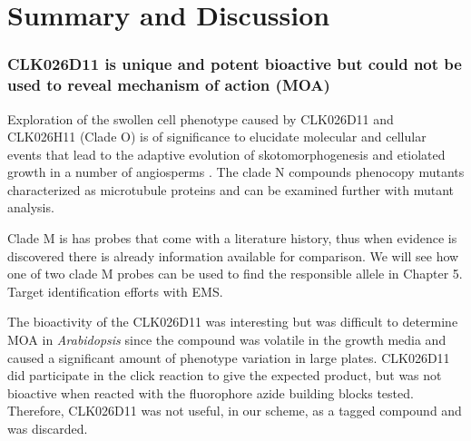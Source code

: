 \section{Summary and Discussion}

\subsubsection{CLK026D11 is unique and potent bioactive but could not be used to reveal mechanism of action (MOA)}

Exploration of the swollen cell phenotype caused by CLK026D11 and CLK026H11 (Clade O) is of significance to elucidate molecular and cellular events that lead to the adaptive evolution of skotomorphogenesis and etiolated growth in a number of angiosperms \cite{gendreau1997cellular, gendreau1998phytochrome}. The clade N compounds phenocopy mutants characterized as microtubule proteins \cite{nakamura2004low} and can be examined further with mutant analysis. 




Clade M is has probes that come with a literature history, thus when evidence is discovered there is already information available for comparison. We will see how one of two clade M probes can be used to find the responsible allele in Chapter 5. Target identification efforts with EMS. 

The bioactivity of the CLK026D11 was interesting but was difficult to determine MOA in {\it Arabidopsis} since the compound was volatile in the growth media and caused a significant amount of phenotype variation in large plates. CLK026D11 did participate in the click reaction to give the expected product, but was not bioactive when reacted with the fluorophore azide building blocks tested. Therefore, CLK026D11 was not useful, in our scheme, as a tagged compound and was discarded.



